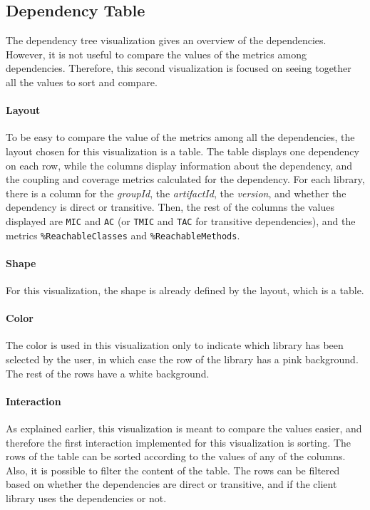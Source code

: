\subsection{Dependency Table}
The dependency tree visualization gives an overview of the dependencies. However, it is not useful to compare the values of the metrics among dependencies. Therefore, this second visualization is focused on seeing together all the values to sort and compare.

\paragraph{Layout}
To be easy to compare the value of the metrics among all the dependencies, the layout chosen for this visualization is a table. The table displays one dependency on each row, while the columns display information about the dependency, and the coupling and coverage metrics calculated for the dependency. For each library, there is a column for the \textit{groupId}, the \textit{artifactId}, the \textit{version}, and whether the dependency is direct or transitive. Then, the rest of the columns the values displayed are \texttt{MIC} and \texttt{AC} (or \texttt{TMIC} and \texttt{TAC} for transitive dependencies), and the metrics \texttt{\%ReachableClasses} and \texttt{\%ReachableMethods}.

\paragraph{Shape}
For this visualization, the shape is already defined by the layout, which is a table.

\paragraph{Color}
The color is used in this visualization only to indicate which library has been selected by the user, in which case the row of the library has a pink background. The rest of the rows have a white background.

\paragraph{Interaction}
As explained earlier, this visualization is meant to compare the values easier, and therefore the first interaction implemented for this visualization is sorting. The rows of the table can be sorted according to the values of any of the columns. Also, it is possible to filter the content of the table. The rows can be filtered based on whether the dependencies are direct or transitive, and if the client library uses the dependencies or not.

